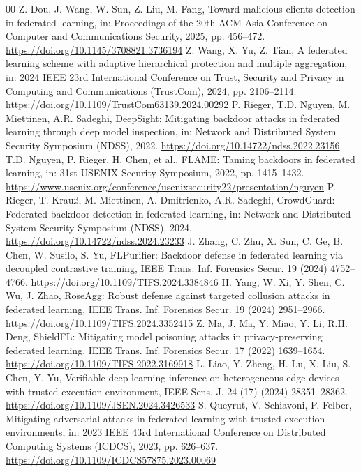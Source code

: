 \documentclass[final,5p,times,twocolumn]{elsarticle/elsarticle}
\begin{document}
\begin{thebibliography}{00}
     Z. Dou, J. Wang, W. Sun, Z. Liu, M. Fang, Toward malicious clients detection in federated learning, in: Proceedings of the 20th ACM Asia Conference on Computer and Communications Security, 2025, pp. 456--472. \url{https://doi.org/10.1145/3708821.3736194}
     Z. Wang, X. Yu, Z. Tian, A federated learning scheme with adaptive hierarchical protection and multiple aggregation, in: 2024 IEEE 23rd International Conference on Trust, Security and Privacy in Computing and Communications (TrustCom), 2024, pp. 2106--2114. \url{https://doi.org/10.1109/TrustCom63139.2024.00292}
     P. Rieger, T.D. Nguyen, M. Miettinen, A.R. Sadeghi, DeepSight: Mitigating backdoor attacks in federated learning through deep model inspection, in: Network and Distributed System Security Symposium (NDSS), 2022. \url{https://doi.org/10.14722/ndss.2022.23156}
     T.D. Nguyen, P. Rieger, H. Chen, et al., FLAME: Taming backdoors in federated learning, in: 31st USENIX Security Symposium, 2022, pp. 1415--1432. \url{https://www.usenix.org/conference/usenixsecurity22/presentation/nguyen}
     P. Rieger, T. Krau{\ss}, M. Miettinen, A. Dmitrienko, A.R. Sadeghi, CrowdGuard: Federated backdoor detection in federated learning, in: Network and Distributed System Security Symposium (NDSS), 2024. \url{https://doi.org/10.14722/ndss.2024.23233}
     J. Zhang, C. Zhu, X. Sun, C. Ge, B. Chen, W. Susilo, S. Yu, FLPurifier: Backdoor defense in federated learning via decoupled contrastive training, IEEE Trans. Inf. Forensics Secur. 19 (2024) 4752--4766. \url{https://doi.org/10.1109/TIFS.2024.3384846}
     H. Yang, W. Xi, Y. Shen, C. Wu, J. Zhao, RoseAgg: Robust defense against targeted collusion attacks in federated learning, IEEE Trans. Inf. Forensics Secur. 19 (2024) 2951--2966. \url{https://doi.org/10.1109/TIFS.2024.3352415}
     Z. Ma, J. Ma, Y. Miao, Y. Li, R.H. Deng, ShieldFL: Mitigating model poisoning attacks in privacy-preserving federated learning, IEEE Trans. Inf. Forensics Secur. 17 (2022) 1639--1654. \url{https://doi.org/10.1109/TIFS.2022.3169918}
     L. Liao, Y. Zheng, H. Lu, X. Liu, S. Chen, Y. Yu, Verifiable deep learning inference on heterogeneous edge devices with trusted execution environment, IEEE Sens. J. 24 (17) (2024) 28351--28362. \url{https://doi.org/10.1109/JSEN.2024.3426533}
     S. Queyrut, V. Schiavoni, P. Felber, Mitigating adversarial attacks in federated learning with trusted execution environments, in: 2023 IEEE 43rd International Conference on Distributed Computing Systems (ICDCS), 2023, pp. 626--637. \url{https://doi.org/10.1109/ICDCS57875.2023.00069}

\end{thebibliography}
\end{document}
